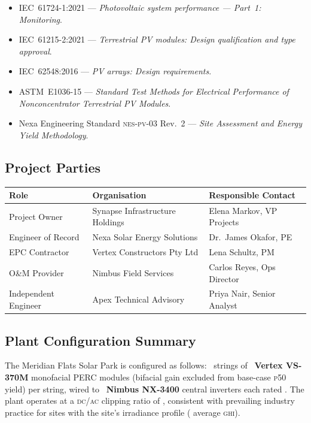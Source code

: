 \begin{itemize}[leftmargin=1.4em, itemsep=3pt]
  \item IEC~61724-1:2021 — \textit{Photovoltaic system performance --- Part~1: Monitoring}.
  \item IEC~61215-2:2021 — \textit{Terrestrial PV modules: Design qualification and type approval}.
  \item IEC~62548:2016 — \textit{PV arrays: Design requirements}.
  \item ASTM~E1036-15 — \textit{Standard Test Methods for Electrical Performance of Nonconcentrator
        Terrestrial PV Modules}.
  \item Nexa Engineering Standard \textsc{nes-pv-03} Rev.~2 — \textit{Site Assessment and
        Energy Yield Methodology}.
\end{itemize}

\subsection{Project Parties}

\begin{center}
\begin{tabular}{@{} l l l @{}}
  \toprule
  \rowcolor{SolarMist}
  \textbf{Role} & \textbf{Organisation} & \textbf{Responsible Contact} \\
  \midrule
  Project Owner        & Synapse Infrastructure Holdings & Elena Markov, VP Projects \\
  Engineer of Record   & Nexa Solar Energy Solutions     & Dr.~James Okafor, PE \\
  EPC Contractor       & Vertex Constructors Pty Ltd     & Lena Schultz, PM \\
  O\&M Provider        & Nimbus Field Services           & Carlos Reyes, Ops Director \\
  Independent Engineer & Apex Technical Advisory         & Priya Nair, Senior Analyst \\
  \bottomrule
\end{tabular}
\end{center}

\subsection{Plant Configuration Summary}

The Meridian Flats Solar Park is configured as follows: ~strings of
~\textbf{Vertex VS-370M} monofacial PERC modules (bifacial gain excluded from
base-case \textsc{p50} yield) per string, wired to ~\textbf{Nimbus NX-3400}
central inverters each rated . The plant operates at a
\textsc{dc}/\textsc{ac} clipping ratio of , consistent with prevailing industry
practice for sites with the site's irradiance profile ( average \textsc{ghi}).
